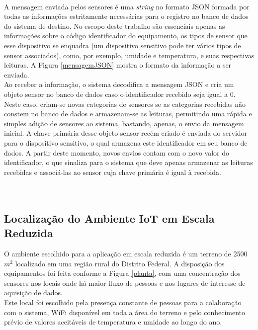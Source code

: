 \\\null \quad A mensagem enviada pelos sensores é uma \textit{string} no formato JSON formada por todas as informações estritamente necessárias para o registro no banco de dados do sistema de destino.
No escopo deste trabalho são essenciais apenas as informações sobre o código identificador do equipamento, os tipos de sensor que esse dispositivo se enquadra (um dispositivo sensitivo pode ter vários tipos de sensor associados), como, por exemplo, umidade e temperatura, e suas respectivas leituras. A Figura \ref{mensagemJSON} mostra o formato da informação a ser enviada.
\\\null \quad Ao receber a informação, o sistema decodifica a mensagem JSON e cria um objeto sensor no banco de dados caso o identificador recebido seja igual a 0. Neste caso, criam-se novas categorias de sensores se as categorias recebidas não constem no banco de dados e armazenam-se as leituras, permitindo uma rápida e simples adição de sensores ao sistema, bastando, apenas, o envio da mensagem inicial. A chave primária desse objeto sensor recém criado é enviada do servidor para o dispositivo sensitivo, o qual armazena este identificador em seu banco de dados. A partir deste momento, novos envios contam com o novo valor do identificador, o que sinaliza para o sistema que deve apenas armazenar as leituras recebidas e associá-las ao sensor cuja chave primária é igual à recebida.
\\\\\\

\subsection{Localização do Ambiente IoT em Escala Reduzida}
\quad O ambiente escolhido para a aplicação em escala reduzida é um terreno de 2500 $m^2$ localizado em uma
região rural do Distrito Federal. A disposição dos equipamentos foi feita conforme a Figura \ref{planta},
com uma concentração dos sensores nos locais onde há maior fluxo de pessoas e nos lugares de interesse de
aquisição de dados.
\\\null \quad Este local foi escolhido pela presença constante de pessoas para a colaboração com o sistema, WiFi disponível em toda a área do terreno e pelo conhecimento prévio de valores aceitáveis de temperatura
  e umidade ao longo do ano.
\newpage

